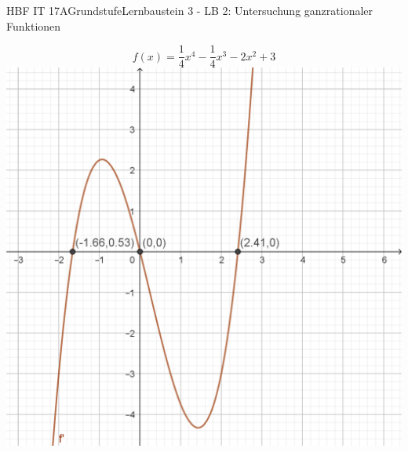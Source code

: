 \documentclass[oneside,openany,headings=optiontotoc,11pt,numbers=noenddot]{scrreprt}
\begin{document}
	\begin{worksheet}{HBF IT 17A}{Grundstufe}{Lernbaustein 3 - LB 2: Untersuchung ganzrationaler Funktionen}

		\begin{framed}
			\noindent
			\[f(x) = \frac{1}{4}x^4 - \frac{1}{4}x^3 - 2x^2 + 3\]
			\includegraphics[scale=0.7]{Bilder/HOPTIP_f'.png}
		\end{framed}
	

\end{worksheet}
\end{document}
